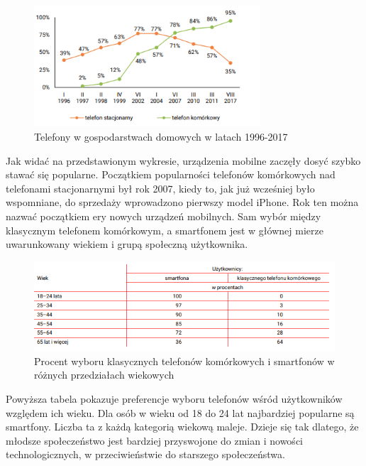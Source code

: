 \documentclass[a4paper,12pt,oneside]{book}
\begin{document}
	\newpage
	\begin{figure}[h]
		\centering
		\includegraphics[width=0.75\textwidth]{grafika/cbos_wykres}
		\caption{Telefony w gospodarstwach domowych w latach 1996-2017}
	\end{figure}

	Jak widać na przedstawionym wykresie, urządzenia mobilne zaczęły dosyć szybko stawać się popularne. Początkiem popularności telefonów komórkowych nad telefonami stacjonarnymi był rok 2007, kiedy to, jak już wcześniej było wspomniane, do sprzedaży wprowadzono pierwszy model iPhone. Rok ten można nazwać początkiem ery nowych urządzeń mobilnych. Sam wybór między klasycznym telefonem komórkowym, a smartfonem jest w głównej mierze uwarunkowany wiekiem i grupą społeczną użytkownika.
	
	\begin{figure}[h]
		\centering
		\includegraphics[width=1\textwidth]{grafika/cbos_wykres2}
		\caption{Procent wyboru klasycznych telefonów komórkowych i smartfonów w różnych przedziałach wiekowych}
	\end{figure}

	\newpage

	Powyższa tabela pokazuje preferencje wyboru telefonów wśród użytkowników względem ich wieku. Dla osób w wieku od 18 do 24 lat najbardziej popularne są smartfony. Liczba ta z każdą kategorią wiekową maleje. Dzieje się tak dlatego, że młodsze społeczeństwo jest bardziej przyswojone do zmian i nowości technologicznych, w przeciwieństwie do starszego społeczeństwa.
	
\end{document}

